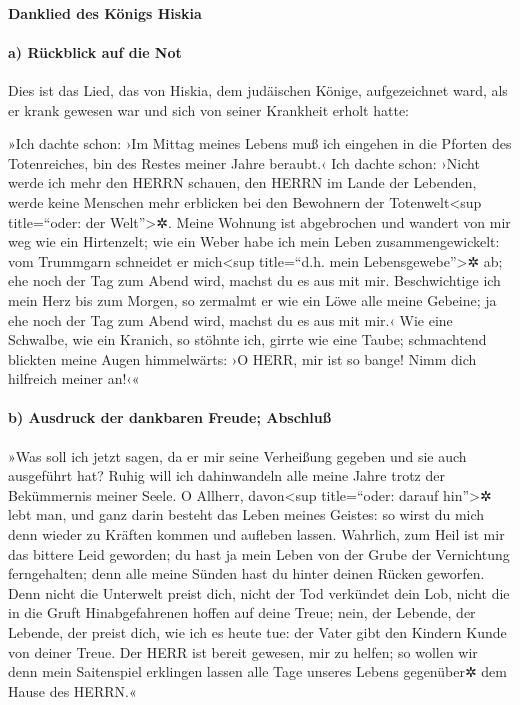 \hypertarget{danklied-des-kuxf6nigs-hiskia}{%
\paragraph{Danklied des Königs
Hiskia}\label{danklied-des-kuxf6nigs-hiskia}}

\hypertarget{a-ruxfcckblick-auf-die-not}{%
\paragraph{a) Rückblick auf die Not}\label{a-ruxfcckblick-auf-die-not}}

Dies ist das Lied, das von Hiskia, dem judäischen Könige,
aufgezeichnet ward, als er krank gewesen war und sich von seiner
Krankheit erholt hatte:

»Ich dachte schon: ›Im Mittag meines Lebens muß ich
eingehen in die Pforten des Totenreiches, bin des Restes meiner Jahre
beraubt.‹ Ich dachte schon: ›Nicht werde ich mehr den
HERRN schauen, den HERRN im Lande der Lebenden, werde keine Menschen
mehr erblicken bei den Bewohnern der Totenwelt\textless sup
title=``oder: der Welt''\textgreater✲. Meine Wohnung ist
abgebrochen und wandert von mir weg wie ein Hirtenzelt; wie ein Weber
habe ich mein Leben zusammengewickelt: vom Trummgarn schneidet er
mich\textless sup title=``d.h. mein Lebensgewebe''\textgreater✲ ab; ehe
noch der Tag zum Abend wird, machst du es aus mit mir.
Beschwichtige ich mein Herz bis zum Morgen, so zermalmt
er wie ein Löwe alle meine Gebeine; ja ehe noch der Tag zum Abend wird,
machst du es aus mit mir.‹ Wie eine Schwalbe, wie ein
Kranich, so stöhnte ich, girrte wie eine Taube; schmachtend blickten
meine Augen himmelwärts: ›O HERR, mir ist so bange! Nimm dich hilfreich
meiner an!‹«

\hypertarget{b-ausdruck-der-dankbaren-freude-abschluuxdf}{%
\paragraph{b) Ausdruck der dankbaren Freude;
Abschluß}\label{b-ausdruck-der-dankbaren-freude-abschluuxdf}}

»Was soll ich jetzt sagen, da er mir seine Verheißung
gegeben und sie auch ausgeführt hat? Ruhig will ich dahinwandeln alle
meine Jahre trotz der Bekümmernis meiner Seele. O
Allherr, davon\textless sup title=``oder: darauf hin''\textgreater✲ lebt
man, und ganz darin besteht das Leben meines Geistes: so wirst du mich
denn wieder zu Kräften kommen und aufleben lassen.
Wahrlich, zum Heil ist mir das bittere Leid geworden; du
hast ja mein Leben von der Grube der Vernichtung ferngehalten; denn alle
meine Sünden hast du hinter deinen Rücken geworfen. Denn
nicht die Unterwelt preist dich, nicht der Tod verkündet dein Lob, nicht
die in die Gruft Hinabgefahrenen hoffen auf deine Treue;
nein, der Lebende, der Lebende, der preist dich, wie ich
es heute tue: der Vater gibt den Kindern Kunde von deiner Treue.
Der HERR ist bereit gewesen, mir zu helfen; so wollen wir
denn mein Saitenspiel erklingen lassen alle Tage unseres Lebens
gegenüber✲ dem Hause des HERRN.«

